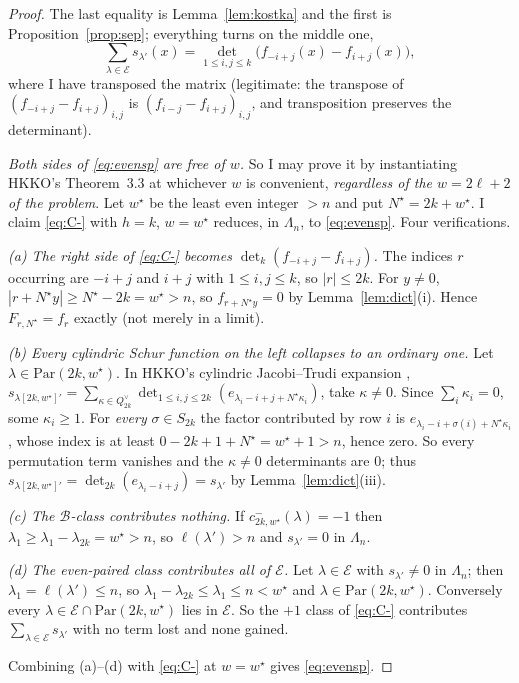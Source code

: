 \documentclass[11pt]{article}
\theoremstyle{plain}
\theoremstyle{definition}
\newcommand{\Par}{\mathrm{Par}}
\newcommand{\Lam}{\Lambda_n}
\begin{document}
\begin{proof}
The last equality is Lemma~\ref{lem:kostka} and the first is
Proposition~\ref{prop:sep}; everything turns on the middle one,
\begin{equation}\label{eq:evensp}
  \sum_{\lambda\in\mathcal E}s_{\lambda'}(x)
   =\det_{1\le i,j\le k}\bigl(f_{-i+j}(x)-f_{i+j}(x)\bigr),
\end{equation}
where I have transposed the matrix (legitimate: the transpose of
$(f_{-i+j}-f_{i+j})_{i,j}$ is $(f_{i-j}-f_{i+j})_{i,j}$, and transposition preserves the
determinant).

\emph{Both sides of \eqref{eq:evensp} are free of $w$.}  So I may prove it by instantiating
HKKO's Theorem~3.3 at whichever $w$ is convenient, \emph{regardless of the $w=2\ell+2$ of
the problem}.  Let $w^\star$ be the least even integer $>n$ and put
$N^\star=2k+w^\star$.  I claim \eqref{eq:C-} with $h=k$, $w=w^\star$ reduces, in $\Lam$, to
\eqref{eq:evensp}.  Four verifications.

\emph{(a) The right side of \eqref{eq:C-} becomes $\det_k(f_{-i+j}-f_{i+j})$.}  The indices
$r$ occurring are $-i+j$ and $i+j$ with $1\le i,j\le k$, so $|r|\le 2k$.  For $y\ne0$,
$|r+N^\star y|\ge N^\star-2k=w^\star>n$, so $f_{r+N^\star y}=0$ by
Lemma~\ref{lem:dict}(i).  Hence $F_{r,N^\star}=f_r$ exactly (not merely in a limit).

\emph{(b) Every cylindric Schur function on the left collapses to an ordinary one.}  Let
$\lambda\in\Par(2k,w^\star)$.  In HKKO's cylindric Jacobi--Trudi expansion
\cite[Rem.~1.5(3)]{HKKO},
$s_{\lambda[2k,w^\star]'}=\sum_{\kappa\in Q^\vee_{2k}}
 \det_{1\le i,j\le2k}(e_{\lambda_i-i+j+N^\star\kappa_i})$,
take $\kappa\ne0$.  Since $\sum_i\kappa_i=0$, some $\kappa_i\ge1$.  For \emph{every}
$\sigma\in S_{2k}$ the factor contributed by row $i$ is
$e_{\lambda_i-i+\sigma(i)+N^\star\kappa_i}$, whose index is at least
$0-2k+1+N^\star=w^\star+1>n$, hence zero.  So every permutation term vanishes and the
$\kappa\ne0$ determinants are $0$; thus
$s_{\lambda[2k,w^\star]'}=\det_{2k}(e_{\lambda_i-i+j})=s_{\lambda'}$ by
Lemma~\ref{lem:dict}(iii).

\emph{(c) The $\mathcal B$-class contributes nothing.}  If $c^-_{2k,w^\star}(\lambda)=-1$
then $\lambda_1\ge\lambda_1-\lambda_{2k}=w^\star>n$, so $\ell(\lambda')>n$ and
$s_{\lambda'}=0$ in $\Lam$.

\emph{(d) The even-paired class contributes all of $\mathcal E$.}  Let
$\lambda\in\mathcal E$ with $s_{\lambda'}\ne0$ in $\Lam$; then $\lambda_1=\ell(\lambda')\le n$,
so $\lambda_1-\lambda_{2k}\le\lambda_1\le n<w^\star$ and $\lambda\in\Par(2k,w^\star)$.
Conversely every $\lambda\in\mathcal E\cap\Par(2k,w^\star)$ lies in $\mathcal E$.  So the
$+1$ class of \eqref{eq:C-} contributes $\sum_{\lambda\in\mathcal E}s_{\lambda'}$ with no
term lost and none gained.

Combining (a)--(d) with \eqref{eq:C-} at $w=w^\star$ gives \eqref{eq:evensp}.
\end{proof}
\end{document}
